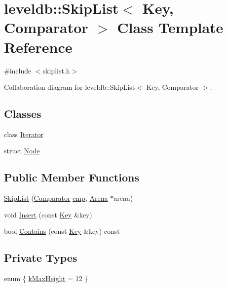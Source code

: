 \hypertarget{classleveldb_1_1_skip_list}{\section{leveldb\-:\-:Skip\-List$<$ Key, Comparator $>$ Class Template Reference}
\label{classleveldb_1_1_skip_list}
}


{\ttfamily \#include $<$skiplist.\-h$>$}



Collaboration diagram for leveldb\-:\-:Skip\-List$<$ Key, Comparator $>$\-:
\subsection*{Classes}
\begin{DoxyCompactItemize}
\item 
class \hyperlink{classleveldb_1_1_skip_list_1_1_iterator}{Iterator}
\item 
struct \hyperlink{structleveldb_1_1_skip_list_1_1_node}{Node}
\end{DoxyCompactItemize}
\subsection*{Public Member Functions}
\begin{DoxyCompactItemize}
\item 
\hyperlink{classleveldb_1_1_skip_list_a793060fb1b44b01c6f510aa16387c6ee}{Skip\-List} (\hyperlink{structleveldb_1_1_comparator}{Comparator} \hyperlink{table__test_8cc_a87863e435922f0910ca8db43f02a6c0b}{cmp}, \hyperlink{classleveldb_1_1_arena}{Arena} $\ast$arena)
\item 
void \hyperlink{classleveldb_1_1_skip_list_af1ed755f0825f38272aafe3cae4da644}{Insert} (const \hyperlink{namespaceleveldb_a7e9a9725b13fa0bd922d885280dfab95}{Key} \&key)
\item 
bool \hyperlink{classleveldb_1_1_skip_list_a134b36bafbfecf325bb7b57bc2490f87}{Contains} (const \hyperlink{namespaceleveldb_a7e9a9725b13fa0bd922d885280dfab95}{Key} \&key) const 
\end{DoxyCompactItemize}
\subsection*{Private Types}
\begin{DoxyCompactItemize}
\item 
enum \{ \hyperlink{classleveldb_1_1_skip_list_a2e64dde7e3a6df57e1b4a43ff4ab0ef8a60ca280962bbbc6e8055b14fb11a81b5}{k\-Max\-Height} = 12
 \}
\end{DoxyCompactItemize}
